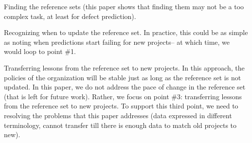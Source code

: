 \item Finding the reference sets (this paper shows that finding
  them may not be a too complex task, at least for defect prediction).
  \item Recognizing when to update  the reference set. In practice,
  this could be as simple as noting when predictions start failing for new projects-- at which time, we would loop to point \#1.
\item Transferring
  lessons from the reference set to new projects.  
\squishend
In this approach, the policies of the organization will be
stable just as long as the reference set is not updated.
In this paper, we do not address the pace of change in the reference set
(that is left for future work).
Rather, we focus on point \#3: transferring lessons from
the reference set to new projects. To support this third point,
we need to  resolving the problems
  that this paper addresses (data expressed in different terminology,
  cannot transfer till there is enough data to match old projects to new).

  

